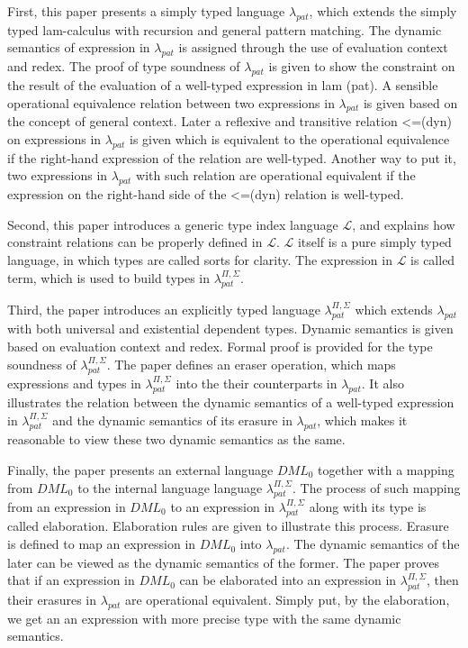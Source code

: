 \documentclass{llncs}
\newcommand{\dmllampat}{$\lambda_{pat}$}
\newcommand{\dmlL}{$\mathcal{L}$}
\newcommand{\dmllamall}{$\lambda_{pat}^{\Pi,\Sigma}$}
\newcommand{\dmlzero}{$DML_0$}
\begin{document}
First, this paper presents a simply typed language \dmllampat, which extends the
simply typed lam-calculus with recursion and general pattern matching. The
dynamic semantics of expression in \dmllampat{} is assigned through the use of
evaluation context and redex. The proof of type soundness of \dmllampat{} is
given to show the constraint on the result of the evaluation of a well-typed
expression in lam (pat). A sensible operational equivalence relation
between two expressions in \dmllampat{} is given based on the concept of general
context. Later a reflexive and transitive relation <=(dyn) on expressions in
\dmllampat{} is given which is equivalent to the operational equivalence if the
right-hand expression of the relation are well-typed. Another way to put it,
two expressions in \dmllampat{} with such relation are operational equivalent
if the expression on the right-hand side of the <=(dyn) relation is well-typed.

Second, this paper introduces a generic type index language \dmlL, and explains
how constraint relations can be properly defined in \dmlL. \dmlL{} itself is a pure
simply typed language, in which types are called sorts for clarity. The
expression in \dmlL{} is called term, which is used to build types in \dmllamall.

Third, the paper introduces an explicitly typed language \dmllamall{} which
extends \dmllampat{} with both universal and existential dependent types. Dynamic
semantics is given based on evaluation context and redex. Formal proof
is provided for the type soundness of \dmllamall. The paper defines an
eraser operation, which maps expressions and types in \dmllamall{} into the
their counterparts in \dmllampat. It also illustrates the relation between
the dynamic semantics of a well-typed expression in \dmllamall{} and the
dynamic semantics of its erasure in \dmllampat, which makes it reasonable to
view these two dynamic semantics as the same.

Finally, the paper presents an external language \dmlzero{} together with a mapping
from \dmlzero{} to the internal language language \dmllamall. The process of such
mapping from an expression in \dmlzero{} to an expression in \dmllamall{} along with
its type is called elaboration. Elaboration rules are given to illustrate this
process. Erasure is defined to map an expression in \dmlzero{} into \dmllampat. The
dynamic semantics of the later can be viewed as the dynamic semantics of the
former. The paper proves that if an expression in \dmlzero{} can be elaborated into
an expression in \dmllamall, then their erasures in \dmllampat{} are operational
equivalent. Simply put, by the elaboration, we get an an expression with more
precise type with the same dynamic semantics.  
\end{document}
